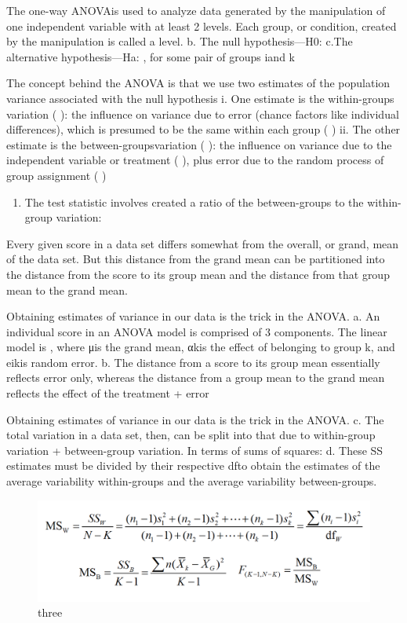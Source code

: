 \documentclass[]{book}
\providecommand{\tightlist}{%
  \setlength{\itemsep}{0pt}\setlength{\parskip}{0pt}}
\theoremstyle{definition}
\theoremstyle{definition}
\theoremstyle{definition}
\theoremstyle{remark}
\begin{document}
{The one-way ANOVAis used to analyze data generated by the manipulation
of one independent variable with at least 2 levels. Each group, or
condition, created by the manipulation is called a level. b. The null
hypothesis---H0: c.The alternative hypothesis---Ha: , for some pair of
groups iand k

The concept behind the ANOVA is that we use two estimates of the
population variance associated with the null hypothesis i. One estimate
is the within-groups variation ( ): the influence on variance due to
error (chance factors like individual differences), which is presumed to
be the same within each group ( ) ii. The other estimate is the
between-groupsvariation ( ): the influence on variance due to the
independent variable or treatment ( ), plus error due to the random
process of group assignment ( )

\begin{enumerate}
\def\labelenumi{\roman{enumi}.}
\setcounter{enumi}{2}
\tightlist
\item
  The test statistic involves created a ratio of the between-groups to
  the within-group variation:
\end{enumerate}

Every given score in a data set differs somewhat from the overall, or
grand, mean of the data set. But this distance from the grand mean can
be partitioned into the distance from the score to its group mean and
the distance from that group mean to the grand mean.

Obtaining estimates of variance in our data is the trick in the ANOVA.
a. An individual score in an ANOVA model is comprised of 3 components.
The linear model is , where μis the grand mean, αkis the effect of
belonging to group k, and eikis random error. b. The distance from a
score to its group mean essentially reflects error only, whereas the
distance from a group mean to the grand mean reflects the effect of the
treatment + error

Obtaining estimates of variance in our data is the trick in the ANOVA.
c. The total variation in a data set, then, can be split into that due
to within-group variation + between-group variation. In terms of sums of
squares: d. These SS estimates must be divided by their respective dfto
obtain the estimates of the average variability within-groups and the
average variability between-groups.

\begin{figure}
\centering
\includegraphics{img/hicksanova3.png}
\caption{three}
\end{figure}

}
\end{document}
